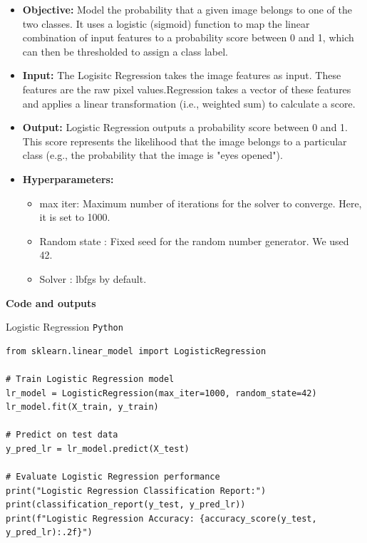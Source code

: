 \documentclass{modeleRapport}
\begin{document}
\begin{itemize}
    \item \textbf{Objective:} Model the probability that a given image belongs to one of the two classes.
    It uses a logistic (sigmoid) function to map the linear combination of input features to a probability score between 0 and 1, which can then be thresholded to assign a class label.

    \item \textbf{Input:} The Logisitc Regression takes the image features as input. These features are the raw pixel values.Regression takes a vector of these features and applies a linear transformation (i.e., weighted sum) to calculate a score.

    \item \textbf{Output:} Logistic Regression outputs a probability score between 0 and 1. This score represents the likelihood that the image belongs to a particular class (e.g., the probability that the image is "eyes opened").

    \item \textbf{Hyperparameters:}
    \begin{itemize}
        \item max iter: Maximum number of iterations for the solver to converge. Here, it is set to 1000.
        \item Random state : Fixed seed for the random number generator. We used 42.
        \item Solver : lbfgs by default.
    \end{itemize}
   
\end{itemize}
\bigskip
\bigskip
\textbf{Code and outputs\\}
\begin{codebox}[LR Classifier]{Logistic Regression \texttt{Python}}
\begin{verbatim}
from sklearn.linear_model import LogisticRegression

# Train Logistic Regression model
lr_model = LogisticRegression(max_iter=1000, random_state=42)
lr_model.fit(X_train, y_train)

# Predict on test data
y_pred_lr = lr_model.predict(X_test)

# Evaluate Logistic Regression performance
print("Logistic Regression Classification Report:")
print(classification_report(y_test, y_pred_lr))
print(f"Logistic Regression Accuracy: {accuracy_score(y_test, y_pred_lr):.2f}")
\end{verbatim}
\end{codebox}
\end{document}
